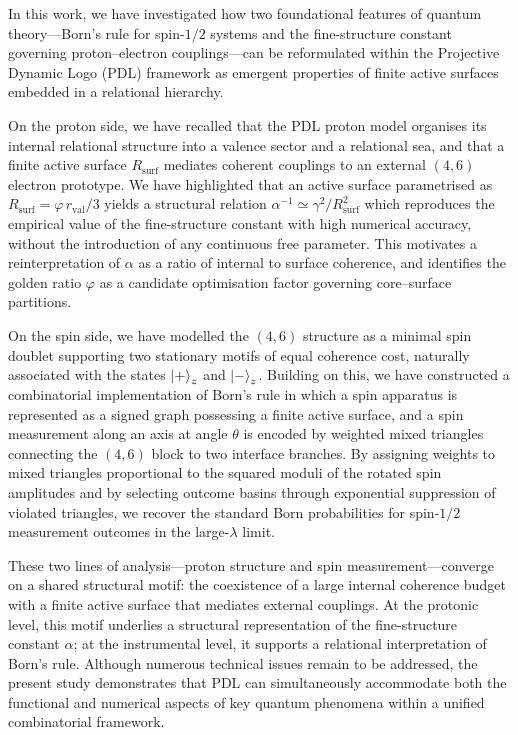 \documentclass[11pt,a4paper]{article}
\numberwithin{equation}{section}
\begin{document}
In this work, we have investigated how two foundational features of quantum theory—Born’s rule for spin-$1/2$ systems and the fine-structure constant governing proton–electron couplings—can be reformulated within the Projective Dynamic Logo (PDL) framework as emergent properties of finite active surfaces embedded in a relational hierarchy.

On the proton side, we have recalled that the PDL proton model organises its internal relational structure into a valence sector and a relational sea, and that a finite active surface $R_{\mathrm{surf}}$ mediates coherent couplings to an external $(4,6)$ electron prototype. We have highlighted that an active surface parametrised as $R_{\mathrm{surf}}=\varphi\,r_{\mathrm{val}}/3$ yields a structural relation $\alpha^{-1}\simeq\gamma^2/R_{\mathrm{surf}}^2$ which reproduces the empirical value of the fine-structure constant with high numerical accuracy, without the introduction of any continuous free parameter. This motivates a reinterpretation of $\alpha$ as a ratio of internal to surface coherence, and identifies the golden ratio $\varphi$ as a candidate optimisation factor governing core–surface partitions.

On the spin side, we have modelled the $(4,6)$ structure as a minimal spin doublet supporting two stationary motifs of equal coherence cost, naturally associated with the states $\ket{+}_z$ and $\ket{-}_z$. Building on this, we have constructed a combinatorial implementation of Born’s rule in which a spin apparatus is represented as a signed graph possessing a finite active surface, and a spin measurement along an axis at angle $\theta$ is encoded by weighted mixed triangles connecting the $(4,6)$ block to two interface branches. By assigning weights to mixed triangles proportional to the squared moduli of the rotated spin amplitudes and by selecting outcome basins through exponential suppression of violated triangles, we recover the standard Born probabilities for spin-$1/2$ measurement outcomes in the large-$\lambda$ limit.

These two lines of analysis—proton structure and spin measurement—converge on a shared structural motif: the coexistence of a large internal coherence budget with a finite active surface that mediates external couplings. At the protonic level, this motif underlies a structural representation of the fine-structure constant $\alpha$; at the instrumental level, it supports a relational interpretation of Born’s rule. Although numerous technical issues remain to be addressed, the present study demonstrates that PDL can simultaneously accommodate both the functional and numerical aspects of key quantum phenomena within a unified combinatorial framework.
\end{document}

